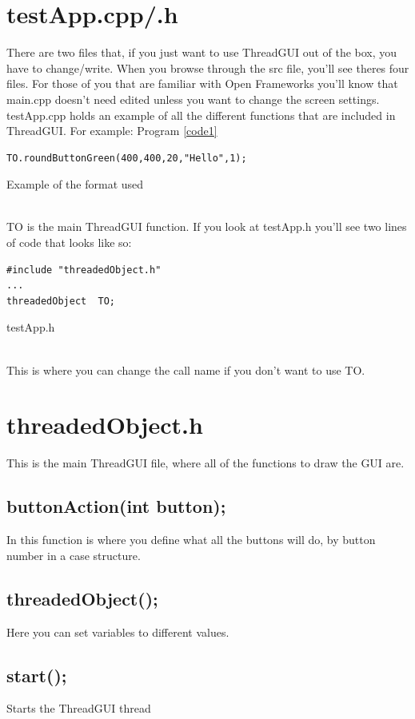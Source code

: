 \documentclass{article}
\begin{document}
\section{testApp.cpp/.h}
There are two files that, if you just want to use ThreadGUI out of the box, you have to change/write. When you browse through the src file, you'll see theres four files. For those of you that are familiar with Open Frameworks you'll know that main.cpp doesn't need edited unless you want to change the screen settings. testApp.cpp holds an example of all the different functions that are included in ThreadGUI. For example: Program \ref{code1}\\
\begin{program}
\begin{verbatim}
TO.roundButtonGreen(400,400,20,"Hello",1);
\end{verbatim}
\caption{Example of the format used}
\label{code1}
\end{program}\\
TO is the main ThreadGUI function. If you look at testApp.h you'll see two lines of code that looks like so:\\
\begin{program}
\begin{verbatim}
#include "threadedObject.h"
...
threadedObject	TO;
\end{verbatim}
\caption{testApp.h}
\label{code2}
\end{program}\\
This is where you can change the call name if you don't want to use TO.
\section{threadedObject.h}
This is the main ThreadGUI file, where all of the functions to draw the GUI are. 
\subsection{buttonAction(int button);}
In this function is where you define what all the buttons will do, by button number in a case structure.
\subsection{threadedObject();}
Here you can set variables to different values.
\subsection{start();}
Starts the ThreadGUI thread
\end{document}
